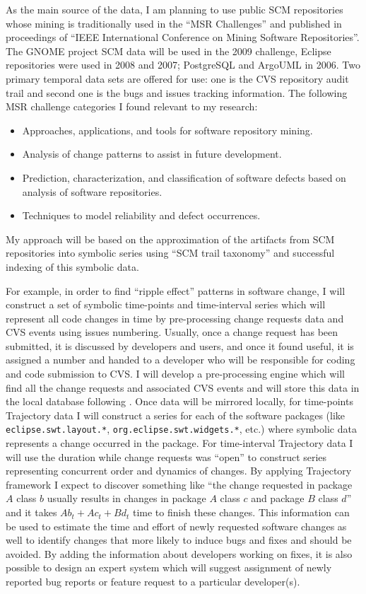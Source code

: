 As the main source of the data, I am planning to use public SCM repositories whose mining is traditionally used in the ``MSR Challenges'' \cite{citeulike:5043676} and published in proceedings of ``IEEE International Conference on Mining Software Repositories''. The GNOME project SCM data will be used in the 2009 challenge, Eclipse repositories were used in 2008 and 2007; PostgreSQL and ArgoUML in 2006. Two primary temporal data sets are offered for use: one is the CVS repository audit trail and second one is the bugs and issues tracking information. The following MSR challenge categories I found relevant to my research:
\begin{itemize}
  \item Approaches, applications, and tools for software repository mining.
  \item Analysis of change patterns to assist in future development.
	\item Prediction, characterization, and classification of software defects based on analysis of software repositories.
	\item Techniques to model reliability and defect occurrences.
\end{itemize}
My approach will be based on the approximation of the artifacts from SCM repositories into symbolic series using ``SCM trail taxonomy'' and successful indexing of this symbolic data. 

For example, in order to find ``ripple effect'' patterns in software change, I will construct a set of symbolic time-points and time-interval series which will represent all code changes in time by pre-processing change requests data and CVS events using issues numbering. Usually, once a change request has been submitted, it is discussed by developers and users, and once it found useful, it is assigned a number and handed to a developer who will be responsible for coding and code submission to CVS. I will develop a pre-processing engine which will find all the change requests and associated CVS events and will store this data in the local database following \cite{citeulike:5333719}. Once data will be mirrored locally, for time-points Trajectory data I will construct a series for each of the software packages (like \texttt{eclipse.swt.layout.*}, \texttt{org.eclipse.swt.widgets.*}, etc.) where symbolic data represents a change occurred in the package. For time-interval Trajectory data I will use the duration while change requests was ``open'' to construct series representing concurrent order and dynamics of changes. By applying Trajectory framework I expect to discover something like ``the change requested in package $A$ class $b$ usually results in changes in package $A$ class $c$ and package $B$ class $d$'' and it takes $Ab_{t} + Ac_{t} + Bd_{t}$ time to finish these changes. This information can be used to estimate the time and effort of newly requested software changes as well to identify changes that more likely to induce bugs and fixes and should be avoided. By adding the information about developers working on fixes, it is also possible to design an expert system which will suggest assignment of newly reported bug reports or feature request to a particular developer(s).

